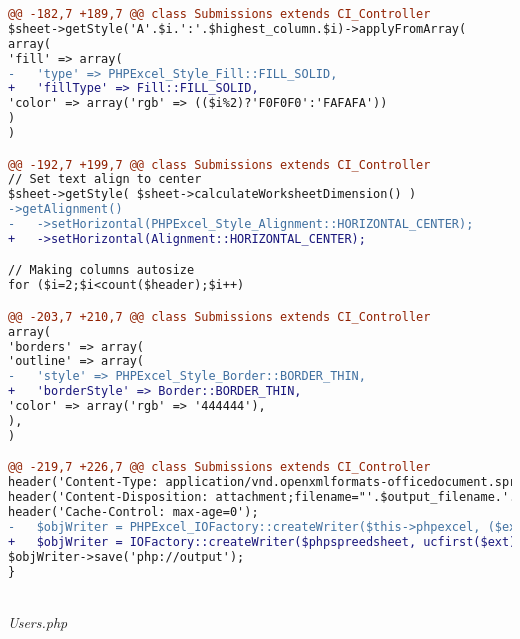\begin{lstlisting}[language=diff, basicstyle=\ttfamily, frame=single,
columns=fullflexible, keepspaces=true, breaklines=true]
@@ -182,7 +189,7 @@ class Submissions extends CI_Controller
$sheet->getStyle('A'.$i.':'.$highest_column.$i)->applyFromArray(
array(
'fill' => array(
-   'type' => PHPExcel_Style_Fill::FILL_SOLID,
+   'fillType' => Fill::FILL_SOLID,
'color' => array('rgb' => (($i%2)?'F0F0F0':'FAFAFA'))
)
)

@@ -192,7 +199,7 @@ class Submissions extends CI_Controller
// Set text align to center
$sheet->getStyle( $sheet->calculateWorksheetDimension() )
->getAlignment()
-   ->setHorizontal(PHPExcel_Style_Alignment::HORIZONTAL_CENTER);
+   ->setHorizontal(Alignment::HORIZONTAL_CENTER);

// Making columns autosize
for ($i=2;$i<count($header);$i++)

@@ -203,7 +210,7 @@ class Submissions extends CI_Controller
array(
'borders' => array(
'outline' => array(
-   'style' => PHPExcel_Style_Border::BORDER_THIN,
+   'borderStyle' => Border::BORDER_THIN,
'color' => array('rgb' => '444444'),
),
)

@@ -219,7 +226,7 @@ class Submissions extends CI_Controller
header('Content-Type: application/vnd.openxmlformats-officedocument.spreadsheetml.sheet');
header('Content-Disposition: attachment;filename="'.$output_filename.'.'.$ext.'"');
header('Cache-Control: max-age=0');
-   $objWriter = PHPExcel_IOFactory::createWriter($this->phpexcel, ($ext==='xlsx'?'Excel2007':'Excel5'));
+   $objWriter = IOFactory::createWriter($phpspreedsheet, ucfirst($ext));
$objWriter->save('php://output');
}
\end{lstlisting}
~\\	
	\textit{Users.php}
